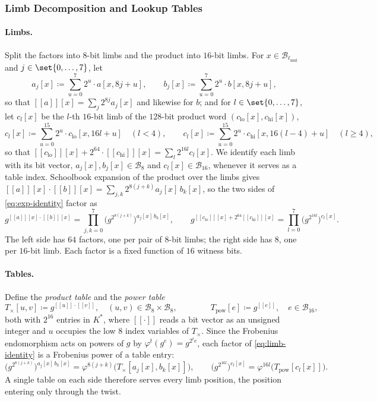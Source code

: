 \documentclass{article}
\theoremstyle{definition}
\newcommand{\BB}{\mathcal{B}}
\newcommand{\intval}[1]{[\![#1]\!]}
\begin{document}
\subsubsection{Limb Decomposition and Lookup Tables}
\label{sec:intmul-limbs}

\paragraph{Limbs.}
Split the factors into $8$-bit limbs and the product into $16$-bit limbs. For $x \in \BB_{\ell_\text{mul}}$ and $j \in \set{0, \ldots, 7}$, let
\[
  a_j[x] \coloneqq \sum_{u = 0}^{7} 2^u \cdot a[x, 8j + u], \qquad b_j[x] \coloneqq \sum_{u = 0}^{7} 2^u \cdot b[x, 8j + u],
\]
so that $\intval{a}[x] = \sum_{j} 2^{8j} a_j[x]$ and likewise for $b$; and for $l \in \set{0, \ldots, 7}$, let $c_l[x]$ be the $l$-th $16$-bit limb of the $128$-bit product word $(c_\text{lo}[x], c_\text{hi}[x])$,
\[
  c_l[x] \coloneqq \sum_{u = 0}^{15} 2^u \cdot c_\text{lo}[x, 16l + u] \quad (l < 4), \qquad c_l[x] \coloneqq \sum_{u = 0}^{15} 2^u \cdot c_\text{hi}[x, 16(l - 4) + u] \quad (l \geq 4),
\]
so that $\intval{c_\text{lo}}[x] + 2^{64} \cdot \intval{c_\text{hi}}[x] = \sum_l 2^{16 l} c_l[x]$. We identify each limb with its bit vector, $a_j[x], b_j[x] \in \BB_8$ and $c_l[x] \in \BB_{16}$, whenever it serves as a table index. Schoolbook expansion of the product over the limbs gives $\intval{a}[x] \cdot \intval{b}[x] = \sum_{j, k} 2^{8(j + k)} a_j[x] \, b_k[x]$, so the two sides of \eqref{eq:exp-identity} factor as
\begin{equation}
  g^{\intval{a}[x] \cdot \intval{b}[x]} = \prod_{j, k = 0}^{7} \bigl( g^{2^{8(j + k)}} \bigr)^{a_j[x] \, b_k[x]}, \qquad g^{\intval{c_\text{lo}}[x] + 2^{64} \intval{c_\text{hi}}[x]} = \prod_{l = 0}^{7} \bigl( g^{2^{16 l}} \bigr)^{c_l[x]}.
  \label{eq:limb-identity}
\end{equation}
The left side has $64$ factors, one per pair of $8$-bit limbs; the right side has $8$, one per $16$-bit limb. Each factor is a fixed function of $16$ witness bits.

\paragraph{Tables.}
Define the \emph{product table} and the \emph{power table}
\[
  T_\times[u, v] \coloneqq g^{\intval{u} \cdot \intval{v}}, \quad (u, v) \in \BB_8 \times \BB_8, \qquad\qquad T_\text{pow}[e] \coloneqq g^{\intval{e}}, \quad e \in \BB_{16},
\]
both with $2^{16}$ entries in $K^*$, where $\intval{\cdot}$ reads a bit vector as an unsigned integer and $u$ occupies the low $8$ index variables of $T_\times$. Since the Frobenius endomorphism acts on powers of $g$ by $\varphi^t(g^e) = g^{2^t e}$, each factor of \eqref{eq:limb-identity} is a Frobenius power of a table entry:
\[
  \bigl( g^{2^{8(j + k)}} \bigr)^{a_j[x] \, b_k[x]} = \varphi^{8(j + k)}\bigl( T_\times[a_j[x], b_k[x]] \bigr), \qquad \bigl( g^{2^{16 l}} \bigr)^{c_l[x]} = \varphi^{16 l}\bigl( T_\text{pow}[c_l[x]] \bigr).
\]
A single table on each side therefore serves every limb position, the position entering only through the twist.
\end{document}
